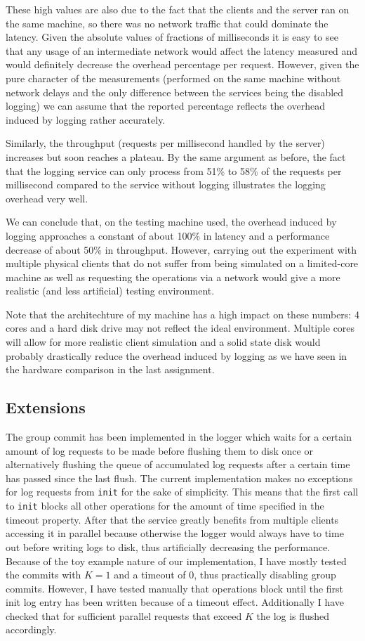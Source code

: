 \documentclass[a4paper,11pt]{article}
\begin{document}
These high values are also due to the fact that the clients and the server ran on the same machine, so there was no network traffic that could dominate the latency. Given the absolute values of fractions of milliseconds it is easy to see that any usage of an intermediate network would affect the latency measured and would definitely decrease the overhead percentage per request. However, given the pure character of the measurements (performed on the same machine without network delays and the only difference between the services being the disabled logging) we can assume that the reported percentage reflects the overhead induced by logging rather accurately.

Similarly, the throughput (requests per millisecond handled by the server) increases but soon reaches a plateau. By the same argument as before, the fact that the logging service can only process from 51\% to 58\% of the requests per millisecond compared to the service without logging illustrates the logging overhead very well.

We can conclude that, on the testing machine used, the overhead induced by logging approaches a constant of about 100\% in latency and a performance decrease of about 50\% in throughput. However, carrying out the experiment with multiple physical clients that do not suffer from being simulated on a limited-core machine as well as requesting the operations via a network would give a more realistic (and less artificial) testing environment.

Note that the architechture of my machine has a high impact on these numbers: 4 cores and a hard disk drive may not reflect the ideal environment. Multiple cores will allow for more realistic client simulation and a solid state disk would probably drastically reduce the overhead induced by logging as we have seen in the hardware comparison in the last assignment.

\subsection{Extensions}
\label{sec:pt5}
The group commit has been implemented in the logger which waits for a certain amount of log requests to be made before flushing them to disk once or alternatively flushing the queue of accumulated log requests after a certain time has passed since the last flush. The current implementation makes no exceptions for log requests from \texttt{init} for the sake of simplicity. This means that the first call to \texttt{init} blocks all other operations for the amount of time specified in the timeout property. After that the service greatly benefits from multiple clients accessing it in parallel because otherwise the logger would always have to time out before writing logs to disk, thus artificially decreasing the performance. Because of the toy example nature of our implementation, I have mostly tested the commits with \(K=1\) and a timeout of 0, thus practically disabling group commits. However, I have tested manually that operations block until the first init log entry has been written because of a timeout effect. Additionally I have checked that for sufficient parallel requests that exceed \(K\) the log is flushed accordingly.
\end{document}
